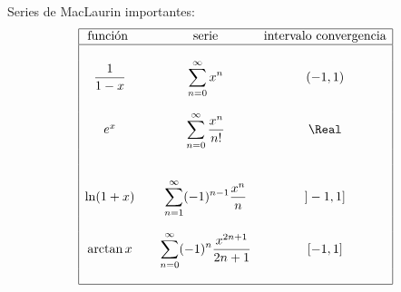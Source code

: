 \documentclass{article}
\begin{document}
{\large Series de MacLaurin importantes:
$$\begin{array}{|cccc|}
  \hline
  \text{función } & & \text{serie} & \text{intervalo convergencia}\\
  \hline
  & & & \\
  \dfrac{1}{1-x} & & \displaystyle\sum_{n=0}^\infty x^n & (-1,1)\\
  & & & \\
  e^x & & \displaystyle\sum_{n=0}^\infty \frac{x^n}{n!} & \Real\\
  & & & \\
  & & & \\
  \ln(1+x) & & \displaystyle\sum_{n=1}^\infty (-1)^{n-1}\frac{x^n}{n} & ]-1,1]\\
  & & & \\
  \arctan x & & \displaystyle\sum_{n=0}^\infty (-1)^n\frac{x^{2n+1}}{2n+1} & [-1,1]\\
  & & & \\
  \hline
\end{array}$$}
\vspace{2mm}

\end{document}
